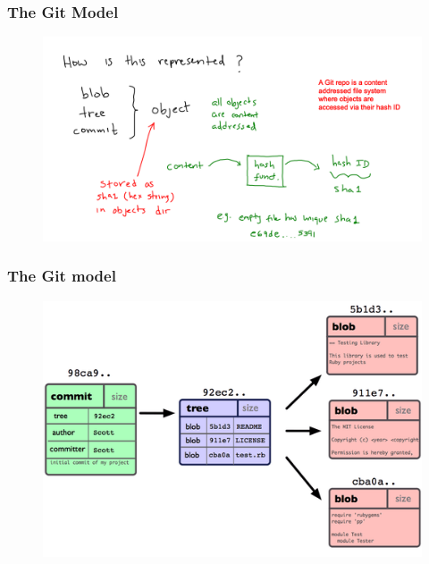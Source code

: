 \documentclass[11pt]{beamer}
\begin{document}
\begin{frame}[fragile]
\frametitle{The Git Model}

\begin{figure}[htp]
 \centering
 \includegraphics[scale=0.2]{git_model3.png}
\end{figure}

\end{frame}




\begin{frame}[fragile]
\frametitle{The Git model}

\begin{figure}[htp]
 \centering
 \includegraphics[scale=0.45]{gitInternals1.png}
\end{figure}






\end{frame}
\end{document}
